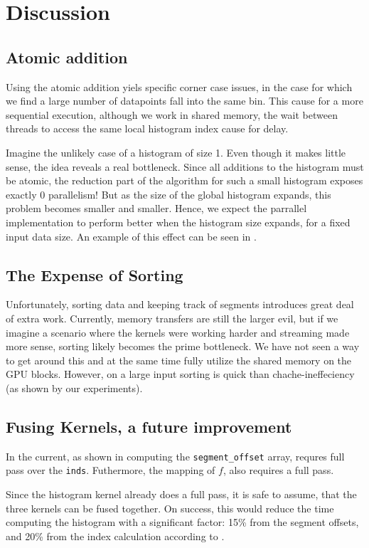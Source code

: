 \documentclass[12pt, a4paper, hidelinks]{article}
\renewcommand{\tt}[1]{\texttt{#1}}
\begin{document}
\section{Discussion}

\subsection{Atomic addition}
Using the atomic addition yiels specific corner case issues, 
in the case for which we find a large number of datapoints fall into the same bin. 
This cause for a more sequential execution, although we work in shared memory, 
the wait between threads to access the same local histogram index cause for delay.


Imagine the unlikely case of a histogram of size 1. Even though it makes little sense,
the idea reveals a real bottleneck. Since all additions to the
histogram must be atomic, the reduction part of the algorithm for
such a small histogram
exposes exactly 0 parallelism! But as the size of the global histogram
expands, this problem becomes smaller and smaller.
Hence, we expect the parrallel implementation to perform better when the
histogram size expands, for a fixed input data size.
An example of this effect can be seen in .

\subsection{The Expense of Sorting}
Unfortunately, sorting data and keeping track of segments
introduces great deal of extra work. Currently, memory transfers are still the larger evil, but if we imagine a scenario where the kernels were working harder and streaming made more sense, sorting likely becomes the prime bottleneck. We have not seen a way to get around this and at the same time fully utilize the shared memory on the GPU blocks. However, on a large input sorting is quick than chache-ineffeciency (as shown by our experiments).

\subsection{Fusing Kernels, a future improvement}
In the current, as shown in  computing the \tt{segment\_offset} array,
requres full pass over the \tt{inds}. Futhermore, the mapping of $f$, also requires a full pass.

Since the histogram kernel already does a full pass,
it is safe to assume, that the three kernels can be fused together.
On success, this would reduce the time computing the histogram with a
significant factor: 15\% from the segment offsets, and 20\% from the index calculation according to
.
\end{document}
